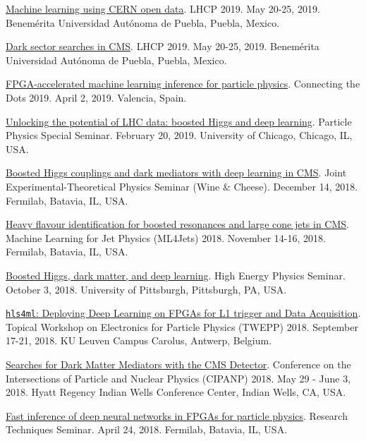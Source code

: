 \documentclass{res}
\begin{document}
\begin{resume}
  \href{https://indico.cern.ch/event/687651/contributions/3428206/}{Machine learning using CERN open data}. LHCP 2019. May 20-25, 2019. Benem\'{e}rita Universidad Aut\'{o}noma de Puebla, Puebla, Mexico.

  \href{https://indico.cern.ch/event/687651/contributions/3426898/}{Dark sector searches in CMS}. LHCP 2019. May 20-25, 2019. Benem\'{e}rita Universidad Aut\'{o}noma de Puebla, Puebla, Mexico.

  \href{https://indico.cern.ch/event/742793/contributions/3274392/}{FPGA-accelerated machine learning inference for particle physics}. Connecting the Dots 2019. April 2, 2019. Valencia, Spain.

  \href{https://universityofchicago.hosted.panopto.com/Panopto/Pages/Viewer.aspx?id=66ca09d7-74c1-4b12-bb57-a9fa01046cdf}{Unlocking the potential of LHC data: boosted Higgs and deep learning}. Particle Physics Special Seminar. February 20, 2019. University of Chicago, Chicago, IL, USA.

  \href{http://theory.fnal.gov/events/event/results-from-cms-18/}{Boosted Higgs couplings and dark mediators with deep learning in CMS}. Joint Experimental-Theoretical Physics Seminar (Wine \& Cheese). December 14, 2018. Fermilab, Batavia, IL, USA.

  \href{https://indico.cern.ch/event/745718/contributions/3211982/}{Heavy flavour identification for boosted resonances and large cone jets in CMS}. Machine Learning for Jet Physics (ML4Jets) 2018. November 14-16, 2018. Fermilab, Batavia, IL, USA.

  \href{https://www.physicsandastronomy.pitt.edu/events/hep-seminar-javier-duarte-fermilab}{Boosted Higgs, dark matter, and deep learning}. High Energy Physics Seminar. October 3, 2018. University of Pittsburgh, Pittsburgh, PA, USA.

  \href{https://indico.cern.ch/event/697988/contributions/3055990/}{\texttt{hls4ml}: Deploying Deep Learning on FPGAs for L1 trigger and Data Acquisition}. Topical Workshop on Electronics for Particle Physics (TWEPP) 2018. September 17-21, 2018. KU Leuven Campus Carolus, Antwerp, Belgium.

  \href{https://conferences.lbl.gov/event/137/session/27/contribution/354}{Searches for Dark Matter Mediators with the CMS Detector}. Conference on the Intersections of Particle and Nuclear Physics (CIPANP) 2018. May 29 - June 3, 2018. Hyatt Regency Indian Wells Conference Center, Indian Wells, CA, USA.

  \href{https://indico.fnal.gov/event/16908/}{Fast inference of deep neural networks in FPGAs for particle physics}. Research Techniques Seminar. April 24, 2018. Fermilab, Batavia, IL, USA.


\end{resume}
\end{document}
